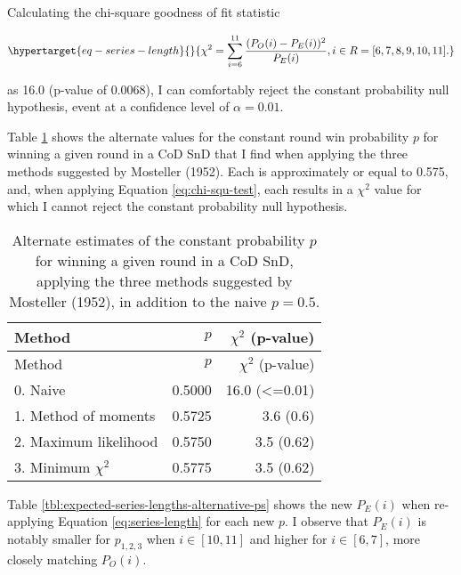 \documentclass{article}
\begin{document}
Calculating the chi-square goodness of fit statistic

\begin{equation}\protect\hypertarget{eq-series-length}{}{
\chi^2 = \sum^{11}_{i=6} \frac{(P_O(i) - P_E(i))^2}{P_E(i)}, i \in R = [6, 7, 8, 9, 10, 11].
}\label{eq:chi-squ-test}\end{equation}

as 16.0 (p-value of 0.0068), I can comfortably reject the constant
probability null hypothesis, event at a confidence level of
\(\alpha = 0.01\).

Table \ref{tbl:mosteller-methods-results} shows the alternate values for
the constant round win probability \(p\) for winning a given round in a
CoD SnD that I find when applying the three methods suggested by
Mosteller (1952). Each is approximately or equal to 0.575, and, when
applying Equation \ref{eq:chi-squ-test}, each results in a \(\chi^2\)
value for which I cannot reject the constant probability null
hypothesis.

\begin{longtable}[]{@{}lrr@{}}
  \caption{Alternate estimates of the constant probability \(p\) for winning a given round in a CoD SnD, applying the three methods suggested by Mosteller (1952), in addition to the naive \(p = 0.5\).}\label{tbl:mosteller-methods-results} \\
  \toprule()
    Method & \(p\) & \(\chi^2\) (p-value) \\
    \midrule()
    \endfirsthead
    \toprule()
    Method & \(p\) & \(\chi^2\) (p-value) \\
    \midrule()
  \endhead
  0. Naive & 0.5000 & 16.0 (\textless=0.01) \\
  1. Method of moments & 0.5725 & 3.6 (0.6) \\
  2. Maximum likelihood & 0.5750 & 3.5 (0.62) \\
  3. Minimum \(\chi^2\) & 0.5775 & 3.5 (0.62) \\
  \bottomrule()
\end{longtable}

Table \ref{tbl:expected-series-lengths-alternative-ps} shows the new
\(P_E(i)\) when re-applying Equation \ref{eq:series-length} for each new
\(p\). I observe that \(P_E(i)\) is notably smaller for \(p_{1,2,3}\)
when \(i \in [10, 11]\) and higher for \(i \in [6, 7]\), more closely
matching \(P_O(i)\).
\end{document}
